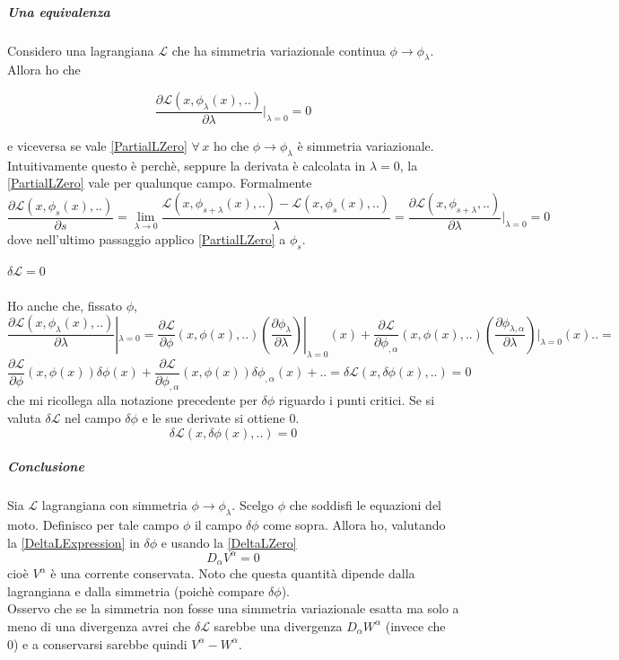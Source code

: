 \documentclass[]{article}
\newcommand{\al}{\alpha}
\begin{document}
\subparagraph{Una equivalenza}
Considero una lagrangiana $\mathcal{L}$ che ha simmetria variazionale continua $\phi \rightarrow \phi_\lambda$. Allora ho che

\begin{equation} \label{PartialLZero}
\dfrac{\partial \mathcal{L} (x, \phi_\lambda(x), ..)}{\partial \lambda}|_{\lambda=0} = 0
\end{equation}

e viceversa se vale \eqref{PartialLZero} $\forall\, x$ ho che $\phi \rightarrow \phi_\lambda$ è simmetria variazionale. Intuitivamente questo è perchè, seppure la derivata è calcolata in $\lambda=0$, la \eqref{PartialLZero} vale per qualunque campo. Formalmente
$$\dfrac{\partial \mathcal{L} (x, \phi_s(x), ..)}{\partial s} = \lim_{\lambda \rightarrow 0} \dfrac{\mathcal{L}(x, \phi_{s+\lambda}(x), ..) - \mathcal{L}(x, \phi_{s}(x), ..)}{\lambda} = \dfrac{\partial \mathcal{L} (x, \phi_{s+\lambda}, ..)}{\partial \lambda}|_{\lambda=0} = 0$$
dove nell'ultimo passaggio applico \eqref{PartialLZero} a $\phi_s$.\\

\subparagraph{$\delta \mathcal{L} = 0$}
Ho anche che, fissato $\phi$,
$$\dfrac{\partial \mathcal{L} (x, \phi_\lambda(x), ..)}{\partial \lambda}|_{\lambda=0} = \dfrac{\partial \mathcal{L}}{\partial \phi} (x, \phi(x), ..) \left(\dfrac{\partial \phi_\lambda}{\partial \lambda}\right)|_{\lambda=0}(x) + \dfrac{\partial \mathcal{L}}{\partial \phi_{,\al}}(x, \phi(x), ..) \left(\dfrac{\partial \phi_{\lambda,\al}}{\partial \lambda}\right)|_{\lambda=0}(x) .. = $$
$$\dfrac{\partial \mathcal{L}}{\partial \phi}(x, \phi(x)) \delta \phi (x) + \dfrac{\partial \mathcal{L}}{\partial \phi_{,\al}}(x, \phi(x)) \delta \phi_{,\al}(x) + .. = \delta \mathcal{L} (x, \delta \phi (x), ..) = 0$$
che mi ricollega alla notazione precedente per $\delta \phi$ riguardo i punti critici. Se si valuta $\delta \mathcal{L}$ nel campo $\delta \phi$ e le sue derivate si ottiene $0$.
\begin{equation} \label{DeltaLZero}
	\delta \mathcal{L} (x, \delta \phi (x), ..) = 0
\end{equation}

\subparagraph{Conclusione}
Sia $\mathcal{L}$ lagrangiana con simmetria $\phi \rightarrow \phi_\lambda$. Scelgo $\phi$ che soddisfi le equazioni del moto. Definisco per tale campo $\phi$ il campo $\delta \phi$ come sopra. Allora ho, valutando la \eqref{DeltaLExpression} in $\delta \phi$ e usando la  \eqref{DeltaLZero}
$$D_\al V^\al = 0$$
cioè $V^\al$ è una corrente conservata. Noto che questa quantità dipende dalla lagrangiana e dalla simmetria (poichè compare $\delta \phi$).\\
Osservo che se la simmetria non fosse una simmetria variazionale esatta ma solo a meno di una divergenza avrei che $\delta \mathcal{L}$ sarebbe una divergenza $D_\al W^\al$ (invece che 0) e a conservarsi sarebbe quindi $V^\al - W^\al$.
\end{document}
